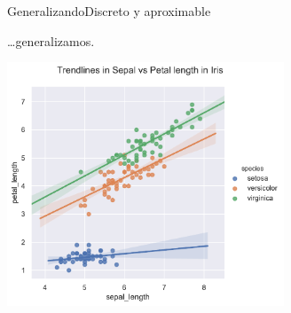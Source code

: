 \documentclass[spanish, c]{beamer}
\begin{document}
\begin{frame}{Generalizando}{Discreto y aproximable}

    \dots generalizamos.

    \begin{center}
        \includegraphics[width=0.62\textwidth]{regplot.pdf}
    \end{center}
    

\end{frame}





\end{document}
